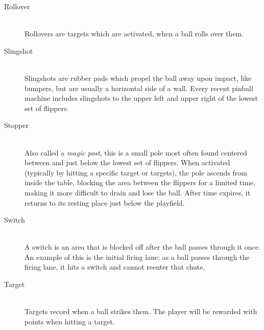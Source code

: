 \documentclass[fontsize=12pt,
               paper=a4,
               twoside=false,
               parskip=half,
               ]{scrartcl}
\begin{document}
\begin{description}
\item[Rollover] \hfill \\
Rollovers are targets which are activated, when a ball rolls over them.

\item[Slingshot] \hfill \\
Slingshots are rubber pads which propel the ball away upon impact, like bumpers, but are usually a horizontal side of a wall. Every recent pinball machine includes slingshots to the upper left and upper right of the lowest set of flippers. %

\item[Stopper] \hfill \\
Also called a \emph{magic post}, this is a small pole most often found centered between and just below the lowest set of flippers. When activated (typically by hitting a specific target or targets), the pole ascends from inside the table, blocking the area between the flippers for a limited time, making it more difficult to drain and lose the ball. After time expires, it returns to its resting place just below the playfield. %

\item[Switch] \hfill \\
A switch is an area that is blocked off after the ball passes through it once. An example of this is the initial firing lane: as a ball passes through the firing lane, it hits a switch and cannot reenter that chute. %

\item[Target] \hfill \\
Targets record when a ball strikes them. The player will be rewarded with points when hitting a target.

\end{description}
\end{document}
